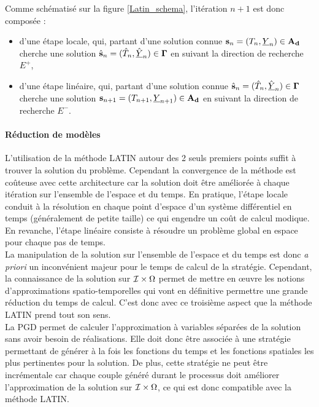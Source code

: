 \documentclass[12pt,a4paper]{report}
\begin{document}
Comme schématisé sur la figure \ref{Latin_schema}, l'itération $n+1$ est donc composée :\\
\begin{itemize}
\item d'une étape locale, qui, partant d'une solution connue $\mathbf{s}_{n} = (T_{n}, \underline{Y}_{n}) \in \mathbf{A_d}$ cherche une solution $\hat{\mathbf{s}}_{n} = (\hat{T}_{n}, \hat{\underline{Y}}_{n}) \in \mbox{$\boldsymbol{\Gamma}$}$ en suivant la direction de recherche $E^+$, \\ 
\item d'une étape linéaire, qui, partant d'une solution connue $\hat{\mathbf{s}}_{n} = (\hat{T}_{n}, \hat{\underline{Y}}_{n}) \in \mbox{$\boldsymbol{\Gamma}$}$ cherche une solution $\mathbf{s}_{n+1} = (T_{n+1}, \underline{Y}_{n+1}) \in \mathbf{A_d}$ en suivant la direction de recherche $E^-$.\\
\end{itemize}


\paragraph{Réduction de modèles }

L'utilisation de la méthode LATIN autour des 2 seuls premiers points suffit à trouver la solution du problème. Cependant la convergence de la méthode est coûteuse avec cette architecture car la solution doit être améliorée à chaque itération sur l'ensemble de l'espace et du temps. En pratique, l'étape locale conduit à la résolution en chaque point d'espace d'un système différentiel en temps (généralement de petite taille) ce qui engendre un coût de calcul modique. En revanche, l'étape linéaire consiste à résoudre un problème global en espace pour chaque pas de temps.\\
La manipulation de la solution sur l'ensemble de l'espace et du temps est donc \textit{a priori} un inconvénient majeur pour le temps de calcul de la stratégie. Cependant, la connaissance de la solution sur $\mathcal{I} \times \Omega$ permet de mettre en œuvre les notions d'approximations spatio-temporelles qui vont en définitive permettre une grande réduction du temps de calcul. C'est donc avec ce troisième aspect que la méthode LATIN prend tout son sens.\\

La PGD permet de calculer l'approximation à variables séparées de la solution sans avoir besoin de réalisations. Elle doit donc être associée à une stratégie permettant de générer à la fois les fonctions du temps et les fonctions spatiales les plus pertinentes pour la solution. De plus, cette stratégie ne peut être incrémentale car chaque couple généré durant le processus doit améliorer l'approximation de la solution sur $\mathcal{I} \times \Omega$, ce qui est donc compatible avec la méthode LATIN.\\
\end{document}

